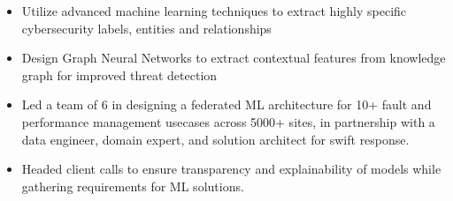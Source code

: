 \documentclass[10pt,a4paper,ragged2e,withhyper]{altacv}
\author{Madhusudan Kumar}
\date{\today}
\title{}
\begin{document}

\makecvheader

\begin{paracol}{2}
\label{sec:orgb71bfc8}
\begin{itemize}
\item Utilize advanced machine learning techniques to extract highly specific cybersecurity labels, entities and relationships
\item Design Graph Neural Networks to extract contextual features from knowledge graph for improved threat detection
\end{itemize}

\par\divider

\begin{itemize}
\item Led a team of 6 in designing a federated ML architecture for 10+ fault and performance management usecases across 5000+ sites, in partnership with a data engineer, domain expert, and solution architect for swift response. 
\item Headed client calls to ensure transparency and explainability of models while gathering requirements for ML solutions.
\end{itemize}


\end{paracol}
\end{document}
